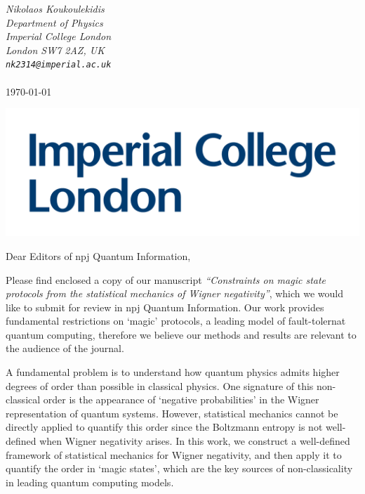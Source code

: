 \documentclass[11pt]{letter}
\begin{document}
\hfill\begin{minipage}{6cm}
	\raggedright
	\vspace{-2.5cm}
	{\footnotesize\itshape Nikolaos Koukoulekidis}\\
	{\footnotesize\itshape Department of Physics}\\
	{\footnotesize\itshape Imperial College London}\\
	{\footnotesize\itshape London SW7 2AZ, UK}\\
	{\footnotesize\itshape %
		\verb|nk2314@imperial.ac.uk|}\\
	~\\
		\footnotesize\today
\end{minipage}

\vspace{-3.5cm}
\includegraphics[scale=.1]{icllogo.png}
\vspace{3.5cm}

\vspace{-1.5cm}
Dear Editors of npj Quantum Information,

\vspace{.3cm}
	
Please find enclosed a copy of our manuscript \emph{``Constraints on magic state protocols from the statistical mechanics of Wigner negativity''}, which we would like to submit for review in npj Quantum Information. 
Our work provides fundamental restrictions on `magic' protocols, a leading model of fault-tolernat quantum computing, therefore we believe our methods and results are relevant to the audience of the journal.

A fundamental problem is to understand how quantum physics admits higher degrees of order than possible in classical physics. One signature of this non-classical order is the appearance of `negative probabilities' in the Wigner representation of quantum systems. However, statistical mechanics cannot be directly applied to quantify this order since the Boltzmann entropy is not well-defined when Wigner negativity arises. In this work, we construct a well-defined framework of statistical mechanics for Wigner negativity, and then apply it to quantify the order in `magic states', which are the key sources of non-classicality in leading quantum computing models.
\end{document}
